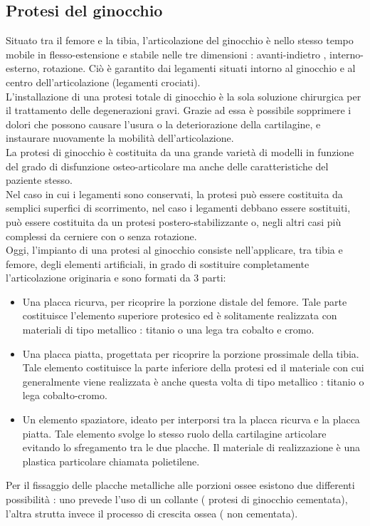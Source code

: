 \documentclass[a4paper]{article}
\begin{document}
\subsection{Protesi del ginocchio}
Situato tra il femore e la tibia, l’articolazione del ginocchio è nello stesso tempo mobile in flesso-estensione e
stabile nelle tre dimensioni : avanti-indietro , interno-esterno, rotazione. Ciò è garantito dai legamenti situati
intorno al ginocchio e al centro dell’articolazione (legamenti crociati). \\
L’installazione di una protesi totale di ginocchio è la
sola soluzione chirurgica per il trattamento delle degenerazioni gravi. Grazie ad essa è possibile sopprimere i
dolori che possono causare l’usura o la deteriorazione della cartilagine, e instaurare nuovamente la mobilità
dell’articolazione. \\
La protesi di ginocchio è costituita da una grande varietà di modelli in funzione del grado di
disfunzione osteo-articolare ma anche delle caratteristiche del paziente stesso. \\
Nel caso in cui i legamenti
sono conservati, la protesi può essere costituita da semplici superfici di scorrimento, nel caso i legamenti
debbano essere sostituiti, può essere costituita da un protesi postero-stabilizzante o, negli altri casi più
complessi da cerniere con o senza rotazione. \\
Oggi, l’impianto di una protesi al ginocchio consiste nell’applicare, tra tibia e femore, degli elementi artificiali,
in grado di sostituire completamente l’articolazione originaria e sono formati da 3 parti:
\begin{itemize}
\item Una placca ricurva, per ricoprire la porzione distale del femore. Tale parte costituisce l’elemento superiore
protesico ed è solitamente realizzata con materiali di tipo metallico : titanio o una lega tra cobalto e
cromo.
\item Una placca piatta, progettata per ricoprire la porzione prossimale della tibia. Tale elemento costituisce la
parte inferiore della protesi ed il materiale con cui generalmente viene realizzata è anche questa volta di
tipo metallico : titanio o lega cobalto-cromo.
\item Un elemento spaziatore, ideato per interporsi tra la placca ricurva e la placca piatta. Tale elemento svolge
lo stesso ruolo della cartilagine articolare evitando lo sfregamento tra le due placche. Il materiale di
realizzazione è una plastica particolare chiamata polietilene.
\end{itemize}
Per il fissaggio delle placche metalliche alle porzioni ossee esistono due differenti possibilità : uno prevede
l’uso di un collante ( protesi di ginocchio cementata), l’altra strutta invece il processo di crescita ossea ( non
cementata).
\end{document}
